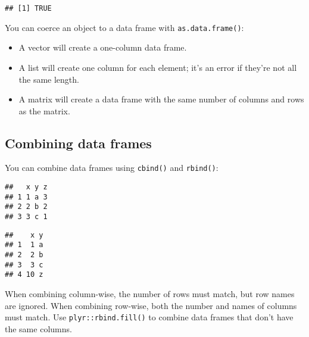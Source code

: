 \begin{verbatim}
## [1] TRUE
\end{verbatim}

You can coerce an object to a data frame with \texttt{as.data.frame()}:

\begin{itemize}
\item
  A vector will create a one-column data frame.
\item
  A list will create one column for each element; it's an error if
  they're not all the same length.
\item
  A matrix will create a data frame with the same number of columns and
  rows as the matrix.
\end{itemize}

\hypertarget{combining-data-frames}{%
\subsection{Combining data frames}\label{combining-data-frames}}

You can combine data frames using \texttt{cbind()} and \texttt{rbind()}:
 

\begin{Shaded}
\begin{Highlighting}[]
\NormalTok{(} \OperatorTok{:}\NormalTok{))}
\end{Highlighting}
\end{Shaded}

\begin{verbatim}
##   x y z
## 1 1 a 3
## 2 2 b 2
## 3 3 c 1
\end{verbatim}

\begin{Shaded}
\begin{Highlighting}[]
\NormalTok{(} \NormalTok{, } \NormalTok{))}
\end{Highlighting}
\end{Shaded}

\begin{verbatim}
##    x y
## 1  1 a
## 2  2 b
## 3  3 c
## 4 10 z
\end{verbatim}

When combining column-wise, the number of rows must match, but row names
are ignored. When combining row-wise, both the number and names of
columns must match. Use \texttt{plyr::rbind.fill()} to combine data
frames that don't have the same columns.

